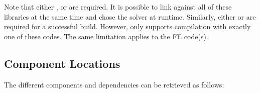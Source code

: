 Note that either \TRILINOS, \PETSC or \UMFPACK are required. It is possible to link against all of these libraries at the same time and chose the solver at runtime. Similarly, either \LAMMPS or \TREMOLO are required for a successful build. However, \MACI only supports compilation with exactly one of these codes. The same limitation applies to the FE code(s).

\subsection{Component Locations}

The different \MACI components and dependencies can be retrieved as follows:

\begin{center}
\tabletail{%
\hline
}


\end{center}
